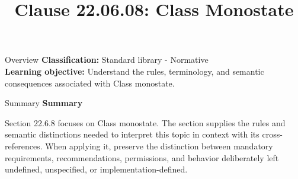 \documentclass[10pt,letterpaper]{article}
\title{Clause 22.06.08: Class Monostate}
\author{}
\date{}
\begin{document}
\maketitle
\begin{CornellOverviewBox}{Overview}
\textbf{Classification:} Standard library - Normative\\[2pt]
\textbf{Learning objective:} Understand the rules, terminology, and semantic consequences associated with Class monostate.
\end{CornellOverviewBox}\begin{CornellSummaryBox}{Summary}
{\sffamily\bfseries\color{Accent} Summary}\par\vspace{3pt}Section 22.6.8 focuses on Class monostate. The section supplies the rules and semantic distinctions needed to interpret this topic in context with its cross-references. When applying it, preserve the distinction between mandatory requirements, recommendations, permissions, and behavior deliberately left undefined, unspecified, or implementation-defined.
\end{CornellSummaryBox}
\end{document}
